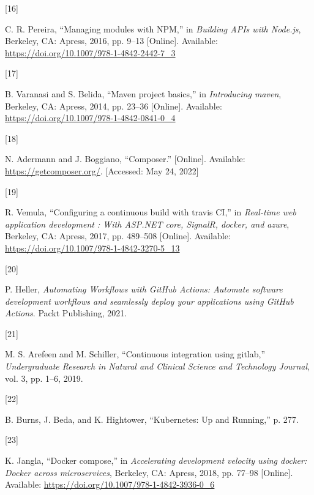 \documentclass[
  a4paper,
  bibtex,
  english,
  nomenclature]{kthlatex/kththesis/kththesis}
\newlength{\cslhangindent}
\newlength{\csllabelwidth}
\newlength{\cslentryspacingunit} %
\newenvironment{CSLReferences}[2] %
 {%
  \setlength{\parindent}{0pt}
  \ifodd #1
  \let\oldpar\par
  \def\par{\hangindent=\cslhangindent\oldpar}
  \fi
  \setlength{\parskip}{#2\cslentryspacingunit}
 }%
 {}
\newcommand{\CSLLeftMargin}[1]{\parbox[t]{\csllabelwidth}{#1}}
\newcommand{\CSLRightInline}[1]{\parbox[t]{\linewidth - \csllabelwidth}{#1}\break}
\begin{document}
\begin{CSLReferences}{0}{0}
\leavevmode{}%
\CSLLeftMargin{{[}16{]} }
\CSLRightInline{C. R. Pereira, {``Managing modules with {NPM},''} in
\emph{Building {APIs} with {Node}.js}, {Berkeley, CA}: {Apress}, 2016,
pp. 9--13 {[}Online{]}. Available:
\url{https://doi.org/10.1007/978-1-4842-2442-7_3}}

\leavevmode{}%
\CSLLeftMargin{{[}17{]} }
\CSLRightInline{B. Varanasi and S. Belida, {``Maven project basics,''}
in \emph{Introducing maven}, {Berkeley, CA}: {Apress}, 2014, pp. 23--36
{[}Online{]}. Available:
\url{https://doi.org/10.1007/978-1-4842-0841-0_4}}

\leavevmode{}%
\CSLLeftMargin{{[}18{]} }
\CSLRightInline{N. Adermann and J. Boggiano, {``Composer.''}
{[}Online{]}. Available: \url{https://getcomposer.org/}. {[}Accessed:
May 24, 2022{]}}

\leavevmode{}%
\CSLLeftMargin{{[}19{]} }
\CSLRightInline{R. Vemula, {``Configuring a continuous build with travis
{CI},''} in \emph{Real-time web application development : {With
ASP}.{NET} core, {SignalR}, docker, and azure}, {Berkeley, CA}:
{Apress}, 2017, pp. 489--508 {[}Online{]}. Available:
\url{https://doi.org/10.1007/978-1-4842-3270-5_13}}

\leavevmode{}%
\CSLLeftMargin{{[}20{]} }
\CSLRightInline{P. Heller, \emph{Automating {Workflows} with {GitHub
Actions}: {Automate} software development workflows and seamlessly
deploy your applications using {GitHub Actions}}. {Packt Publishing},
2021. }

\leavevmode{}%
\CSLLeftMargin{{[}21{]} }
\CSLRightInline{M. S. Arefeen and M. Schiller, {``Continuous integration
using gitlab,''} \emph{Undergraduate Research in Natural and Clinical
Science and Technology Journal}, vol. 3, pp. 1--6, 2019. }

\leavevmode{}%
\CSLLeftMargin{{[}22{]} }
\CSLRightInline{B. Burns, J. Beda, and K. Hightower, {``Kubernetes: {Up}
and {Running},''} p. 277. }

\leavevmode{}%
\CSLLeftMargin{{[}23{]} }
\CSLRightInline{K. Jangla, {``Docker compose,''} in \emph{Accelerating
development velocity using docker: {Docker} across microservices},
{Berkeley, CA}: {Apress}, 2018, pp. 77--98 {[}Online{]}. Available:
\url{https://doi.org/10.1007/978-1-4842-3936-0_6}}


\end{CSLReferences}
\end{document}
